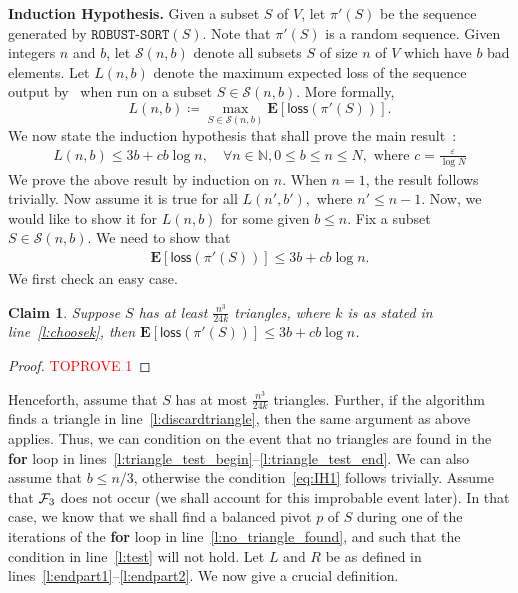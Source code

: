 \documentclass[11pt]{llncs}
\newtheorem{clm}[theorem]{Claim}
\newcommand{\E}{\mathbf{E}}
\newcommand{\cS}{{\mathcal S}}
\newcommand{\loss}{{\textsf{loss}}}
\newcommand{\RS}{{\texttt{ROBUST-SORT}}}
\begin{document}
\noindent
{\bf{Induction Hypothesis.}} Given a subset $S$ of $V$, let $\pi'(S)$ be the sequence generated by $\RS(S)$. Note that $\pi'(S)$ is a random sequence. Given integers $n$ and $b$, let $\cS(n,b)$ denote all subsets $S$ of size $n$ of $V$ which have  $b$ bad elements. Let $L(n,b)$ denote the maximum expected loss of the sequence output by~ when run on a subset $S \in \cS(n, b)$. More formally, 
$$  L(n,b) \coloneqq \max_{S \in \cS(n,b)} \E[\loss(\pi'(S))].$$
We now state the induction hypothesis that shall prove the main result~:
\begin{align}
    \label{eq:IH}
  L(n,b) \leq 3 b + c b \log n, \quad \forall n \in \mathbb{N}, 0 \leq b \leq n \leq N, \mbox{ where } c = \frac{\varepsilon}{\log N}
\end{align}
We prove the above result by induction on $n$. When $n=1$, the result follows trivially. Now assume it is true for all $L(n',b'),$ where $n' \leq n-1$. Now, we would like to show it for $L(n,b)$ for some given $b \leq n$. Fix a subset $S \in \cS(n,b)$. We need to show that 
\begin{align}
    \label{eq:IH1}
    \E[\loss(\pi'(S))] \leq 3b + cb \log n.
\end{align}
We first check an easy case. 

\begin{clm}
    \label{cl:trianglecase}
    Suppose $S$ has at least $\frac{n^3}{24k}$ triangles, where $k$ is as stated in line~\ref{l:choosek}, then $\E[\loss(\pi'(S))] \leq 3b + cb \log n$.
\end{clm}
\begin{proof}\textcolor{red}{TOPROVE 1}\end{proof}
Henceforth, assume that $S$ has at most $\frac{n^3}{24k}$ triangles. Further, if the algorithm finds a triangle in line~\ref{l:discardtriangle}, then the same argument as above applies. Thus, we can condition on the event that no triangles are found in the {\bf for} loop in lines~\ref{l:triangle_test_begin}--\ref{l:triangle_test_end}. We can also assume that $b \leq n/3$, otherwise the condition~\eqref{eq:IH1} follows trivially. Assume that ${\cal F}_3$ does not occur (we shall account for this improbable event later). In that case, we know that we shall find a balanced pivot $p$ of $S$ during one of the iterations of the {\bf for} loop in line~\ref{l:no_triangle_found}, and such that the condition in line~\ref{l:test} will not hold.
Let $L$ and $R$ be as defined in lines~\ref{l:endpart1}--\ref{l:endpart2}. We now give a crucial definition. 
\end{document}

